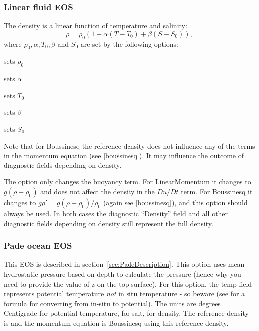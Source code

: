 \subsubsection{Linear fluid EOS}
The density is a linear function of temperature and salinity:
\begin{equation}
  \rho=\rho_0 \left(1-\alpha(T-T_0)+\beta (S-S_0)\right),
\end{equation}
where $\rho_0, \alpha, T_0, \beta$ and $S_0$ are set by the following 
options:
\begin{description}
\item {} sets $\rho_0$
\item {} sets $\alpha$
\item {} sets $T_0$
\item {} sets $\beta$
\item {} sets $S_0$
\end{description}
Note that for Boussinesq the reference density does not 
influence any of the terms in the 
momentum equation (see \eqref{boussinesq}). It may influence the outcome
of diagnostic fields depending on density.

The option  only changes 
the buoyancy term. For LinearMomentum it changes to 
$g(\rho-\rho_0)$ and does not affect the density in the $Du/Dt$ term. For
Boussinesq it changes to 
$g\rho'=g(\rho-\rho_0)/\rho_0$ (again see \eqref{boussinesq}), 
and this option should always be used.
In both cases the diagnostic
``Density'' field and all other diagnostic fields depending on density
still represent the full density.

\subsubsection{Pade ocean EOS}
This EOS is described in section~\ref{sec:PadeDescription}.
This option uses mean hydrostatic pressure based on depth to calculate the
pressure (hence why you need to provide the value of z on the top surface).
For this option, the temp field represents potential temperature \emph{not} in
situ temperature - so beware (see \citet{mcdougall2003} for a formula for converting
from in-situ to potential). The units are degrees Centigrade for potential
temperature, \PSU{} for salt, \kgmm{} for density. The reference density is
\kgmm[1000] and the momentum equation is Boussinesq using this reference density.


